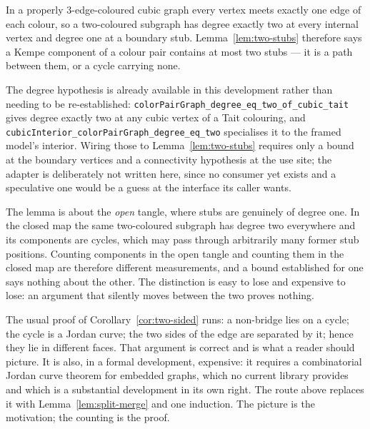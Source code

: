 In a properly $3$-edge-coloured cubic graph every vertex meets exactly one
edge of each colour, so a two-coloured subgraph has degree exactly two at
every internal vertex and degree one at a boundary stub. Lemma~\ref{lem:two-stubs}
therefore says a Kempe component of a colour pair contains at most two stubs
--- it is a path between them, or a cycle carrying none.

The degree hypothesis is already available in this development rather than
needing to be re-established:
\texttt{\scriptsize colorPairGraph\_degree\_eq\_two\_of\_cubic\_tait}
gives degree exactly two at any cubic vertex of a Tait colouring, and
\texttt{\scriptsize cubicInterior\_colorPairGraph\_degree\_eq\_two}
specialises it to the framed model's interior. Wiring those to
Lemma~\ref{lem:two-stubs} requires only a bound at the boundary vertices and
a connectivity hypothesis at the use site; the adapter is deliberately not
written here, since no consumer yet exists and a speculative one would be a
guess at the interface its caller wants.

\begin{remark}
The lemma is about the \emph{open} tangle, where stubs are genuinely of
degree one. In the closed map the same two-coloured subgraph has degree two
everywhere and its components are cycles, which may pass through arbitrarily
many former stub positions. Counting components in the open tangle and
counting them in the closed map are therefore different measurements, and a
bound established for one says nothing about the other. The distinction is
easy to lose and expensive to lose: an argument that silently moves between
the two proves nothing.
\end{remark}

\begin{remark}
The usual proof of Corollary~\ref{cor:two-sided} runs: a non-bridge lies on
a cycle; the cycle is a Jordan curve; the two sides of the edge are
separated by it; hence they lie in different faces. That argument is
correct and is what a reader should picture. It is also, in a formal
development, expensive: it requires a combinatorial Jordan curve theorem
for embedded graphs, which no current library provides and which is a
substantial development in its own right. The route above replaces it with
Lemma~\ref{lem:split-merge} and one induction. The picture is the
motivation; the counting is the proof.
\end{remark}

